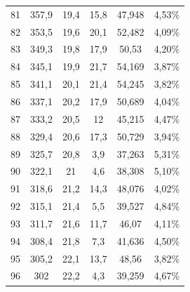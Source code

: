 \begin{longtable}[H]{cccccc}
  81          & 357,9                & 19,4          & 15,8           & 47,948        & 4,53\%                             \\
  82          & 353,5                & 19,6          & 20,1           & 52,482        & 4,09\%                             \\
  83          & 349,3                & 19,8          & 17,9           & 50,53         & 4,20\%                             \\
  84          & 345,1                & 19,9          & 21,7           & 54,169        & 3,87\%                             \\
  85          & 341,1                & 20,1          & 21,4           & 54,245        & 3,82\%                             \\
  86          & 337,1                & 20,2          & 17,9           & 50,689        & 4,04\%                             \\
  87          & 333,2                & 20,5          & 12             & 45,215        & 4,47\%                             \\
  88          & 329,4                & 20,6          & 17,3           & 50,729        & 3,94\%                             \\
  89          & 325,7                & 20,8          & 3,9            & 37,263        & 5,31\%                             \\
  90          & 322,1                & 21            & 4,6            & 38,308        & 5,10\%                             \\
  91          & 318,6                & 21,2          & 14,3           & 48,076        & 4,02\%                             \\
  92          & 315,1                & 21,4          & 5,5            & 39,527        & 4,84\%                             \\
  93          & 311,7                & 21,6          & 11,7           & 46,07         & 4,11\%                             \\
  94          & 308,4                & 21,8          & 7,3            & 41,636        & 4,50\%                             \\
  95          & 305,2                & 22,1          & 13,7           & 48,56         & 3,82\%                             \\
  96          & 302                  & 22,2          & 4,3            & 39,259        & 4,67\%                             \\

\end{longtable}
